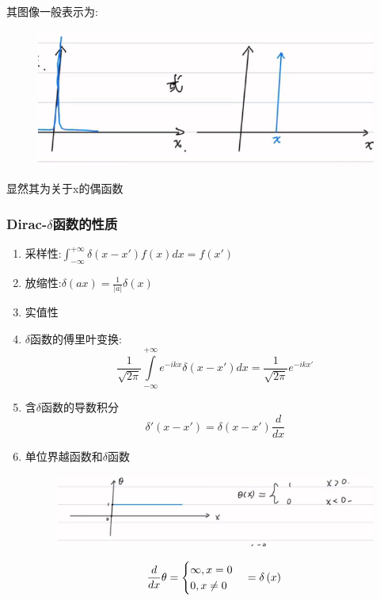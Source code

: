 \documentclass[lang=cn,15pt]{elegantbook}
\begin{document}
 其图像一般表示为:
 \begin{figure}[H]
 	\centering
 	\includegraphics[width=0.7\linewidth]{figure/screenshot0018}
 \end{figure}
 显然其为关于x的偶函数
 \subsubsection{Dirac-$\delta$函数的性质}
 \begin{enumerate}
 	\item 采样性:$\int_{-\infty}^{+\infty}{\delta \left( x-x' \right) f\left( x \right) dx}=f\left( x' \right) 
 	$
 	\item 放缩性:$\delta \left( ax \right) =\frac{1}{|a|}\delta \left( x \right) 
 	$
 	\item 实值性
 	\item $\delta$函数的傅里叶变换:
 	\begin{equation*}
 		\frac{1}{\sqrt{2\pi}}\int\limits_{-\infty}^{+\infty}{e^{-ikx}\delta \left( x-x' \right) dx=}\frac{1}{\sqrt{2\pi}}e^{-ikx'}
 	\end{equation*}
 	\item 含$\delta$函数的导数积分
 	\begin{equation*}
 	\delta' \left( x-x' \right) =\delta \left( x-x' \right) \frac{d}{dx}
 	\end{equation*}
 	\item 单位界越函数和$\delta$函数
 	\begin{figure}[H]
 		\centering
 		\includegraphics[width=0.7\linewidth]{figure/screenshot0019}
 	\end{figure}
 	\begin{equation*}
 		\frac{d}{dx}\theta =\begin{cases}
 			\infty ,x=0\\
 			0,x\ne 0\\
 		\end{cases}=\delta \left( x \right)\\
 	\end{equation*}
 \end{enumerate}
\end{document}
